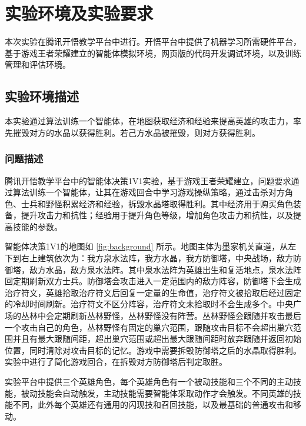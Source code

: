 \section{实验环境及实验要求}
本次实验在腾讯开悟教学平台中进行。开悟平台中提供了机器学习所需硬件平台，基于游戏王者荣耀建立的智能体模拟环境，网页版的代码开发调试环境，以及训练管理和评估环境。

\subsection{实验环境描述}
本实验通过算法训练一个智能体，在地图获取经济和经验来提高英雄的攻击力，率先摧毁对方的水晶以获得胜利。若己方水晶被摧毁，则对方获得胜利。

\subsubsection{问题描述}
腾讯开悟教学平台中的智能体决策1V1实验，基于游戏王者荣耀建立，问题要求通过算法训练一个智能体，让其在游戏回合中学习游戏操纵策略，通过击杀对方角色、士兵和野怪积累经济和经验，拆毁水晶塔取得胜利。其中经济用于购买角色装备，提升攻击力和抗性；经验用于提升角色等级，增加角色攻击力和抗性，以及提高技能的参数。


智能体决策1V1的地图如 \cref{fig:background} 所示。地图主体为墨家机关直道，从左下到右上建筑依次为：我方泉水法阵，我方水晶，我方防御塔，中央战场，敌方防御塔，敌方水晶，敌方泉水法阵。其中泉水法阵为英雄出生和复活地点，泉水法阵回定期刷新双方士兵。防御塔会攻击进入一定范围内的敌方阵容，防御塔下会生成治疗符文，英雄拾取治疗符文后回复一定量的生命值，治疗符文被拾取后经过固定的冷却时间刷新。治疗符文不区分阵容，治疗符文未拾取时不会生成多个。中央广场的丛林中会定期刷新丛林野怪，丛林野怪没有阵营。丛林野怪会跟随并攻击最后一个攻击自己的角色，丛林野怪有固定的巢穴范围，跟随攻击目标不会超出巢穴范围并且有最大跟随间距，超出巢穴范围或超出最大跟随间距时放弃跟随并返回初始位置，同时清除对攻击目标的记忆。游戏中需要拆毁防御塔之后的水晶取得胜利。实验中进行了简化游戏回合，在拆毁对方防御塔后判定取胜。


实验平台中提供三个英雄角色，每个英雄角色有一个被动技能和三个不同的主动技能，被动技能会自动触发，主动技能需要智能体采取动作才会触发。不同英雄的技能不同，此外每个英雄还有通用的闪现技和召回技能，以及最基础的普通攻击和移动。

